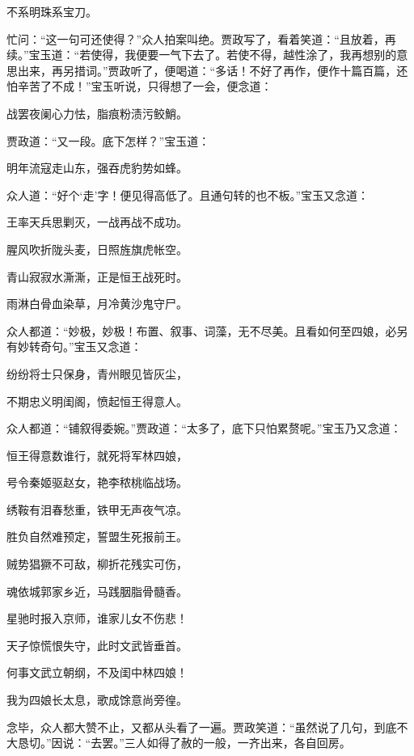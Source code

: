不系明珠系宝刀。

忙问：“这一句可还使得？”众人拍案叫绝。贾政写了，看着笑道：“且放着，再续。”宝玉道：“若使得，我便要一气下去了。若使不得，越性涂了，我再想别的意思出来，再另措词。”贾政听了，便喝道：“多话！不好了再作，便作十篇百篇，还怕辛苦了不成！”宝玉听说，只得想了一会，便念道：

战罢夜阑心力怯，脂痕粉渍污鲛鮹。

贾政道：“又一段。底下怎样？”宝玉道：

明年流寇走山东，强吞虎豹势如蜂。

众人道：“好个‘走’字！便见得高低了。且通句转的也不板。”宝玉又念道：

王率天兵思剿灭，一战再战不成功。

腥风吹折陇头麦，日照旌旗虎帐空。

青山寂寂水澌澌，正是恒王战死时。

雨淋白骨血染草，月冷黄沙鬼守尸。

众人都道：“妙极，妙极！布置、叙事、词藻，无不尽美。且看如何至四娘，必另有妙转奇句。”宝玉又念道：

纷纷将士只保身，青州眼见皆灰尘，

不期忠义明闺阁，愤起恒王得意人。

众人都道：“铺叙得委婉。”贾政道：“太多了，底下只怕累赘呢。”宝玉乃又念道：

恒王得意数谁行，就死将军林四娘，

号令秦姬驱赵女，艳李秾桃临战场。

绣鞍有泪春愁重，铁甲无声夜气凉。

胜负自然难预定，誓盟生死报前王。

贼势猖獗不可敌，柳折花残实可伤，

魂依城郭家乡近，马践胭脂骨髓香。

星驰时报入京师，谁家儿女不伤悲！

天子惊慌恨失守，此时文武皆垂首。

何事文武立朝纲，不及闺中林四娘！

我为四娘长太息，歌成馀意尚旁徨。

念毕，众人都大赞不止，又都从头看了一遍。贾政笑道：“虽然说了几句，到底不大恳切。”因说：“去罢。”三人如得了赦的一般，一齐出来，各自回房。

